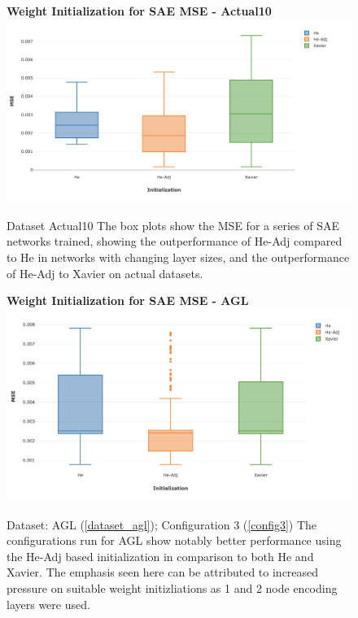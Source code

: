 \documentclass[a4paper,11pt,oneside]{article}
\theoremstyle{plain}
\theoremstyle{definition}
\begin{document}
\begin{figure}[H]
	\centering 
	\textbf{Weight Initialization for SAE MSE - Actual10}
	\includegraphics[scale=0.35]{images/results/init/Actual10_all.png} 
	\caption{Dataset Actual10
		\newline The box plots show the MSE for a series of SAE networks trained, showing the outperformance of He-Adj compared to He in networks with changing layer sizes, and the  outperformance of He-Adj to Xavier on actual datasets.}
	\label{figure-results_init_actual10_all}
\end{figure}

\begin{figure}[H]
	\centering 
	\textbf{Weight Initialization for SAE MSE - AGL}
	\includegraphics[scale=0.35]{images/results/init/AGL_all.png} 
	\caption{Dataset: AGL (\ref{dataset_agl}); Configuration 3 (\ref{config3})
		\newline The configurations run for AGL show notably better performance using the He-Adj based initialization in comparison to both He and Xavier. The emphasis seen here can be attributed to increased pressure on suitable weight initizliations as 1 and 2 node encoding layers were used.}
	\label{figure-results_init_agl_all}
\end{figure}
\end{document}
